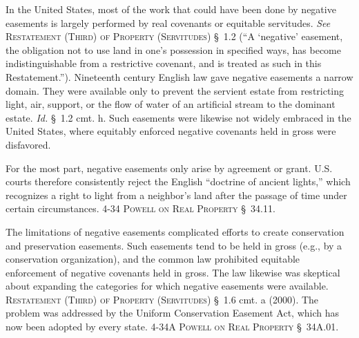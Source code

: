In the United States, most of the work that could have been done by negative
easements is largely performed by real covenants or equitable
servitudes. \emph{See} \textsc{Restatement (Third) of
Property (Servitudes)} \S~1.2 (``A `negative' easement, the obligation not to
use land in one's possession in specified ways, has become indistinguishable
from a restrictive covenant, and is treated as such in this Restatement.'').
Nineteenth century English law gave negative easements a narrow domain. They
were available only to prevent the servient estate from restricting light, air,
support, or the flow of water of an artificial stream to the dominant estate.
\textit{Id.} \S~1.2 cmt. h. Such easements were likewise not widely embraced in
the United States, where equitably enforced negative covenants held in gross
were disfavored. 

For the most part, negative easements only arise by agreement or grant. U.S.
courts therefore consistently reject the English ``doctrine of ancient lights,''
which recognizes a right to light from a neighbor's land after the passage of
time under certain circumstances. 4-34 \textsc{Powell on Real Property}
\S~34.11.

The limitations of negative easements complicated efforts to create conservation
and preservation easements. Such easements tend to be held in gross (e.g., by a
conservation organization), and the common law prohibited equitable enforcement
of negative covenants held in gross. The law likewise was skeptical about
expanding the categories for which negative easements were available.
\textsc{Restatement (Third) of Property (Servitudes)} \S~1.6 cmt. a (2000). The problem
was addressed by the Uniform Conservation Easement Act, which has now been
adopted by every state.  4-34A \textsc{Powell on Real Property} \S~34A.01.


